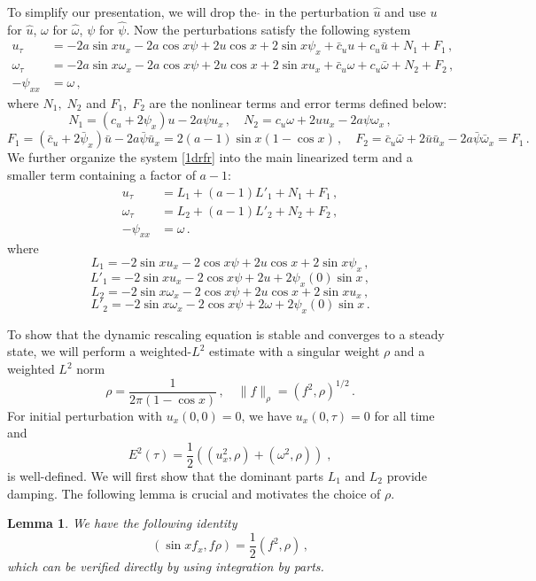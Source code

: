 \documentclass[12pt]{caltech_thesis}
\newtheorem{lemma}[theorem]{Lemma}
\numberwithin{equation}{section}
\begin{document}
To simplify our presentation, we will drop the $\hat{}$ in the perturbation $\hat{u}$ and use $u$ for $\hat{u}$, $\omega$ for $\hat{\omega}$, $\psi$ for $\hat{\psi}$.   Now the perturbations satisfy the following system
\begin{equation}
\label{1drfr}
\begin{aligned}
{u}_{ \tau} &=-2a \sin x u_x-2a \cos x \psi+ 2 u \cos x+2\sin x \psi_x+\bar{c}_u u+ c_u\bar{u}+N_1+F_1\,, \\
{\omega}_{ \tau}&=-2a \sin x \omega_x-2a \cos x\psi +2 u \cos x+2\sin x u_x+\bar{c}_u \omega+ c_u\bar{\omega}+N_2+F_2\,, \\
-{\psi}_{xx} &={\omega}\,,
\end{aligned}
\end{equation}
where $N_1, \; N_2$ and $F_1, \; F_2$ are the nonlinear terms and error terms defined below:
$$N_1=(c_u+2\psi_x)u-2a\psi u_x\,,\quad N_2=c_u\omega+2uu_x-2a\psi \omega_x\,,$$
$$F_1=(\bar{c}_u+2\bar{\psi}_x)\bar{u}-2a\bar{\psi} \bar{u}_x=2(a-1)\sin x(1-\cos x)\,,\quad F_2=\bar{c}_u\bar{\omega}+2\bar{u}\bar{u}_x-2a\bar{\psi} \bar{\omega}_x=F_1\,.$$
We further organize the system \eqref{1drfr} into the main linearized term and a smaller term containing a factor of $a-1$:
\begin{equation}
\label{1drc}
\begin{aligned}
{u}_{ \tau} &=L_1+(a-1)L'_1+N_1+F_1\,, \\
{\omega}_{ \tau}&=L_2+(a-1)L'_2+N_2+F_2\,, \\
-{\psi}_{xx} &={\omega}\,.
\end{aligned}
\end{equation}
where
$$L_1=-2 \sin x u_x-2 \cos x \psi+ 2 u \cos x+2\sin x \psi_x\,,$$ $$ L'_1=-2\sin x u_x-2 \cos x \psi+2u+2\psi_x(0)\sin x\,,$$ $$L_2=-2 \sin x \omega_x-2 \cos x\psi +2 u \cos{x}+2\sin x u_x\,,$$ $$ L'_2=-2 \sin x \omega_x-2 \cos x\psi+2\omega+2\psi_x(0)\sin x \,.$$

To show that the dynamic rescaling equation is stable and converges to a steady state, we will perform a weighted-$L^2$ estimate with a singular weight $\rho$ and a weighted $L^2$ norm$$\rho=\frac{1}{2\pi(1-\cos x)}\,,\quad \|f\|_{\rho}=(f^2,\rho)^{1/2}\,.$$ For initial perturbation with $u_x(0,0)=0$, we have $u_x(0,\tau)=0$ for all time and 
$$E^2(\tau)=\frac{1}{2}((u_x^2,\rho)+(\omega^2,\rho))\; ,$$ 
is well-defined. We will first show that the dominant parts $L_1$ and $L_2$ provide damping.  The following lemma is crucial and motivates the choice of $\rho$.
\begin{lemma}
\label{dampl}We have the following identity
$$(\sin x f_x,f\rho)=\frac{1}{2}(f^2,\rho)\,,$$
which can be verified directly by using integration by parts.
\end{lemma}
\end{document}
